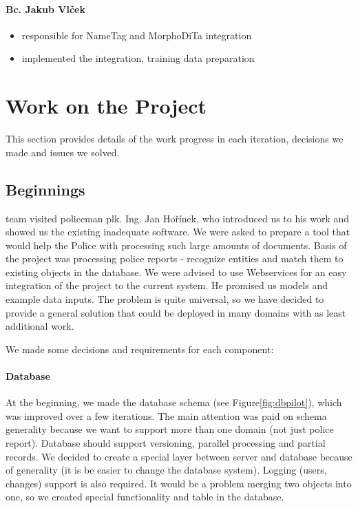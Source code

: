 \paragraph{Bc. Jakub Vlček}
\begin{itemize}
\item responsible for NameTag and MorphoDiTa integration
\item implemented the integration, training data preparation
\end{itemize}

\section{Work on the Project}

This section provides details of the work progress in each iteration, decisions
we made and issues we solved.

\subsection{Beginnings}
\textan{} team visited policeman plk. Ing. Jan Hořínek, who introduced us to his
work and showed us the existing inadequate software. We were asked to prepare
a tool that would help the Police with processing such large amounts of
documents. Basis of the project was processing police reports - recognize
entities and match them to existing objects in the database. We were advised to
use Webservices for an easy integration of the project to the current system. He
promised us models and example data inputs. The problem is quite universal, so
we have decided to provide a general solution that could be deployed in many
domains with as least additional work.

We made some decisions and requirements for each component:

\paragraph{Database}
At the beginning, we made the database schema (see Figure\ref{fig:dbpilot}),
which was improved over a few iterations. The main attention was paid on schema
generality because we want to support more than one domain (not just police
report). Database should support versioning, parallel processing and partial
records. We decided to create a special layer between server and database
because of generality (it is be easier to change the database system). Logging
(users, changes) support is also required. It would be a problem merging two
objects into  one, so we created special functionality and table in the
database.

